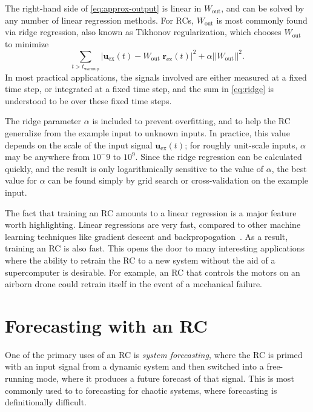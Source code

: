 The right-hand side of \cref{eq:approx-output} is linear in
$W_\text{out}$, and can be solved by any number of linear regression
methods. For RCs, $W_\text{out}$ is most commonly found via ridge
regression, also known as Tikhonov regularization, which chooses
$W_\text{out}$ to minimize
\begin{equation}
  \label{eq:ridge}
  \sum_{t>t_\text{warmup}} |\mathbf{u}_\text{ex}(t) - W_\text{out}\;\mathbf{r}_\text{ex}(t)|^2 + \alpha ||W_\text{out}||^2.
\end{equation}
In most practical applications, the signals involved are either
measured at a fixed time step, or integrated at a fixed time step, and
the sum in \cref{eq:ridge} is understood to be over these fixed time
steps.

The ridge parameter $\alpha$ is included to prevent overfitting, and
to help the RC generalize from the example input to unknown inputs. In
practice, this value depends on the scale of the input signal
$\bm{u}_\text{ex}(t)$; for roughly unit-scale inputs, $\alpha$ may be
anywhere from $10^-{9}$ to $10^9$. Since the ridge regression can be
calculated quickly, and the result is only logarithmically sensitive
to the value of $\alpha$, the best value for $\alpha$ can be found
simply by grid search or cross-validation on the example input.

The fact that training an RC amounts to a linear regression is a major
feature worth highlighting. Linear regressions are very fast, compared
to other machine learning techniques like gradient descent and
backpropogation~\cite{lukosevicius2009}. As a result, training an RC
is also fast. This opens the door to many interesting applications
where the ability to retrain the RC to a new system without the aid of
a supercomputer is desirable. For example, an RC that controls the
motors on an airborn drone could retrain itself in the event of a
mechanical failure.

\section{Forecasting with an RC}\label{sec:forecasting}

One of the primary uses of an RC is \emph{system forecasting}, where
the RC is primed with an input signal from a dynamic system and then
switched into a free-running mode, where it produces a future forecast
of that signal. This is most commonly used to to forecasting for
chaotic systems, where forecasting is definitionally difficult.

